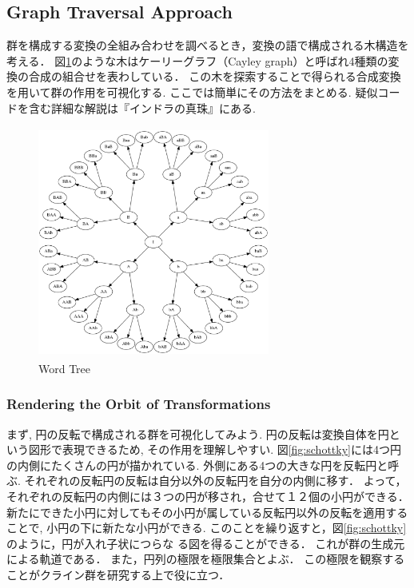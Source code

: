 \subsection{Graph Traversal Approach}

群を構成する変換の全組み合わせを調べるとき，変換の語で構成される木構造を考える．
図\ref{fig:wordTree}のような木はケーリーグラフ（Cayley graph）と呼ばれ4種類の変換の合成の組合せを表わしている．
この木を探索することで得られる合成変換を用いて群の作用を可視化する.
ここでは簡単にその方法をまとめる.
疑似コードを含む詳細な解説は『インドラの真珠』にある.

\begin{figure}[htbp]
 \center
 \includegraphics[width=3in, height=3in, keepaspectratio]{../img/klein/wordTree.pdf}
 \caption{Word Tree}
 \label{fig:wordTree}
\end{figure}

\subsubsection{Rendering the Orbit of Transformations}

まず, 円の反転で構成される群を可視化してみよう.
円の反転は変換自体を円という図形で表現できるため, その作用を理解しやすい.
図\ref{fig:schottky}には4つ円の内側にたくさんの円が描かれている.
外側にある4つの大きな円を反転円と呼ぶ.
それぞれの反転円の反転は自分以外の反転円を自分の内側に移す．
よって，それぞれの反転円の内側には３つの円が移され，合せて１２個の小円ができる．
新たにできた小円に対してもその小円が属している反転円以外の反転を適用することで, 小円の下に新たな小円ができる.
このことを繰り返すと，図\ref{fig:schottky}のように，円が入れ子状につらな
る図を得ることができる．
これが群の生成元による軌道である．
また，円列の極限を極限集合とよぶ．
この極限を観察することがクライン群を研究する上で役に立つ．

